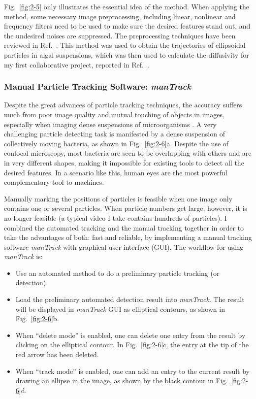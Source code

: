 Fig.~\ref{fig:2-5} only illustrates the essential idea of the method. When applying the method, some necessary image preprocessing, including linear, nonlinear and frequency filters need to be used to make sure the desired features stand out, and the undesired noises are suppressed. The preprocessing techniques have been reviewed in Ref.~\cite{Dorn2008, Rohr2010}. This method was used to obtain the trajectories of ellipsoidal particles in algal suspensions, which was then used to calculate the diffusivity for my first collaborative project, reported in Ref.~\cite{Yang2016}.

\subsubsection{Manual Particle Tracking Software: \textit{manTrack}}
Despite the great advances of particle tracking techniques, the accuracy suffers much from poor image quality and mutual touching of objects in images, especially when imaging dense suspensions of microorganisms \cite{Meijering2009}. A very challenging particle detecting task is manifested by a dense suspension of collectively moving bacteria, as shown in Fig.~\ref{fig:2-6}a. Despite the use of confocal microscopy, most bacteria are seen to be overlapping with others and are in very different shapes, making it impossible for existing tools to detect all the desired features. In a scenario like this, human eyes are the most powerful complementary tool to machines.

Manually marking the positions of particles is feasible when one image only contains one or several particles. When particle numbers get large, however, it is no longer feasible (a typical video I take contains hundreds of particles). I combined the automated tracking and the manual tracking together in order to take the advantages of both: fast and reliable, by implementing a manual tracking software \textit{manTrack} with graphical user interface (GUI). The workflow for using \textit{manTrack} is:

\begin{itemize}
	\item Use an automated method to do a preliminary particle tracking (or detection).
	\item Load the preliminary automated detection result into \textit{manTrack}. The result will be displayed in \textit{manTrack} GUI as elliptical contours, as shown in Fig.~\ref{fig:2-6}b.
	\item When ``delete mode'' is enabled, one can delete one entry from the result by clicking on the elliptical contour. In Fig.~\ref{fig:2-6}c, the entry at the tip of the red arrow has been deleted.
	\item When ``track mode'' is enabled, one can add an entry to the current result by drawing an ellipse in the image, as shown by the black contour in Fig.~\ref{fig:2-6}d.
\end{itemize}

